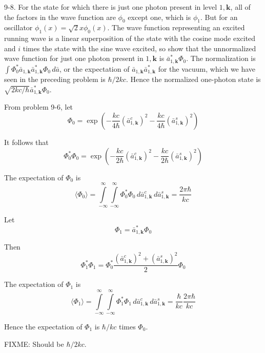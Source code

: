 \documentclass[12pt]{article}
\begin{document}
9-8.
For the state for which there is just one photon
present in level $1,\mathbf k$, all of the factors in the wave function are
$\phi_0$ except one, which is $\phi_1$.
But for an oscillator $\phi_1(x)=\sqrt2x\phi_0(x)$.
The wave function representing an excited running wave is a linear
superposition of the state with the cosine mode excited and $i$
times the state with the sine wave excited, so show that the
unnormalized wave function for just one photon present in
$1,\mathbf k$ is $\bar a_{1,\mathbf k}^*\Phi_0$.
The normalization is
$\int\Phi_0^*\bar a_{1,\mathbf k}\bar a_{1,\mathbf k}^*\Phi_0\,d\bar a$,
or the expectation of $\bar a_{1,\mathbf k}\bar a_{1,\mathbf k}^*$ for the
vacuum, which we have seen in the preceding problem is $\hbar/2kc$.
Hence the normalized one-photon state is
$\sqrt{2kc/\hbar}\bar a_{1,\mathbf k}^*\Phi_0$.

\bigskip
From problem 9-6, let
\begin{equation*}
\Phi_0=\exp\left(-\frac{kc}{4\hbar}(\bar a_{1,\mathbf k}^c)^2-\frac{kc}{4\hbar}(\bar a_{1,\mathbf k}^s)^2\right)
\end{equation*}

It follows that
\begin{equation*}
\Phi_0^*\Phi_0=\exp\left(-\frac{kc}{2\hbar}(\bar a_{1,\mathbf k}^c)^2-\frac{kc}{2\hbar}(\bar a_{1,\mathbf k}^s)^2\right)
\end{equation*}

The expectation of $\Phi_0$ is
\begin{equation*}
\langle\Phi_0\rangle=
\int\limits_{-\infty}^\infty
\int\limits_{-\infty}^\infty
\Phi_0^*\Phi_0
\,d\bar a_{1,\mathbf k}^c\,d\bar a_{1,\mathbf k}^s=\frac{2\pi\hbar}{kc}
\tag{1}
\end{equation*}

Let
\begin{equation*}
\Phi_1=\bar a_{1,\mathbf k}^*\Phi_0
\end{equation*}

Then
\begin{equation*}
\Phi_1^*\Phi_1=\Phi_0^*\frac{(\bar a_{1,\mathbf k}^c)^2+(\bar a_{1,\mathbf k}^s)^2}{2}\Phi_0
\end{equation*}

The expectation of $\Phi_1$ is
\begin{equation*}
\langle\Phi_1\rangle=
\int\limits_{-\infty}^\infty
\int\limits_{-\infty}^\infty
\Phi_1^*\Phi_1
\,d\bar a_{1,\mathbf k}^c\,d\bar a_{1,\mathbf k}^s
=\frac{\hbar}{kc}\frac{2\pi\hbar}{kc}
\tag{2}
\end{equation*}

Hence the expectation of $\Phi_1$ is $\hbar/kc$ times $\Phi_0$.

\bigskip
FIXME: Should be $\hbar/2kc$.
\end{document}
